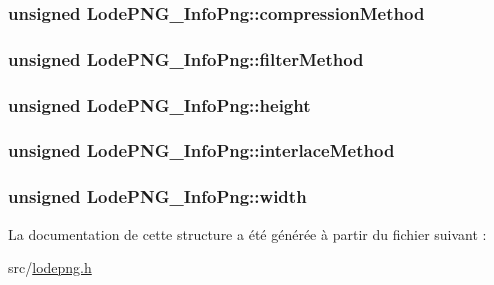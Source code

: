 \subsubsection[{compression\+Method}]{\setlength{\rightskip}{0pt plus 5cm}unsigned Lode\+P\+N\+G\+\_\+\+Info\+Png\+::compression\+Method}\label{struct_lode_p_n_g___info_png_a177065a8eeb66398a89ed93e7c2b2f50}
\hypertarget{struct_lode_p_n_g___info_png_a101ffbacd7026dad4ab062e984cecf17}{}
\subsubsection[{filter\+Method}]{\setlength{\rightskip}{0pt plus 5cm}unsigned Lode\+P\+N\+G\+\_\+\+Info\+Png\+::filter\+Method}\label{struct_lode_p_n_g___info_png_a101ffbacd7026dad4ab062e984cecf17}
\hypertarget{struct_lode_p_n_g___info_png_a4b87ec9649e7177af7a5f5e08e5bc491}{}
\subsubsection[{height}]{\setlength{\rightskip}{0pt plus 5cm}unsigned Lode\+P\+N\+G\+\_\+\+Info\+Png\+::height}\label{struct_lode_p_n_g___info_png_a4b87ec9649e7177af7a5f5e08e5bc491}
\hypertarget{struct_lode_p_n_g___info_png_ad261cbe064eb69a92638e880d99347ca}{}
\subsubsection[{interlace\+Method}]{\setlength{\rightskip}{0pt plus 5cm}unsigned Lode\+P\+N\+G\+\_\+\+Info\+Png\+::interlace\+Method}\label{struct_lode_p_n_g___info_png_ad261cbe064eb69a92638e880d99347ca}
\hypertarget{struct_lode_p_n_g___info_png_a74be99b177b28f3178c02139c4b7f149}{}
\subsubsection[{width}]{\setlength{\rightskip}{0pt plus 5cm}unsigned Lode\+P\+N\+G\+\_\+\+Info\+Png\+::width}\label{struct_lode_p_n_g___info_png_a74be99b177b28f3178c02139c4b7f149}


La documentation de cette structure a été générée à partir du fichier suivant \+:\begin{DoxyCompactItemize}
\item 
src/\hyperlink{lodepng_8h}{lodepng.\+h}\end{DoxyCompactItemize}
